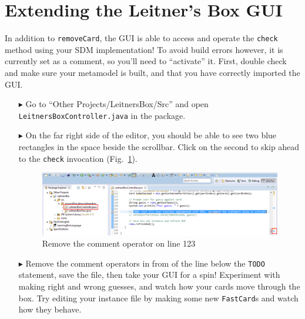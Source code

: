 \newpage
\hypertarget{sec:extendGui}{}
\section{Extending the Leitner's Box GUI}
\genHeader

\vspace{0.5cm}

In addition to \texttt{removeCard}, the GUI is able to access and operate the \texttt{check} method using your SDM implementation! To avoid build errors
however, it is currently set as a comment, so you'll need to ``activate'' it. First, double check and make sure your metamodel is built, and that you have
correctly imported the GUI.

\begin{itemize}

\item[$\blacktriangleright$] Go to ``Other Projects/LeitnersBox/Src'' and open \texttt{Leitners\-Box\-Cont\-roller\-.java} in the package.

\vspace{0.5cm}

\item[$\blacktriangleright$] On the far right side of the editor, you should be able to see two blue rectangles in the space beside the scrollbar. Click on the
second to skip ahead to the \texttt{check} invocation (Fig.~\ref{fig:remComment}).

\vspace{0.5cm}

\begin{figure}[htp]
\begin{center}
  \includegraphics[width=\textwidth]{eclipse_GUICommentLine}
  \caption{Remove the comment operator on line 123}
  \label{fig:remComment}
\end{center}
\end{figure}

\vspace{0.5cm}

\item[$\blacktriangleright$] Remove the comment operators in from of the line below the \texttt{TODO} statement, save the file, then take your GUI for a spin!
Experiment with making right and wrong guesses, and watch how your cards move through the box. Try editing your instance file by making some new
\texttt{FastCard}s and watch how they behave.

\end{itemize}
